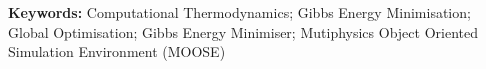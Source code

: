 %

\bigskip
\bigskip
\bigskip

\noindent
\textbf{Keywords:} Computational Thermodynamics; Gibbs Energy Minimisation; Global Optimisation; {\YJ} Gibbs Energy Minimiser; Mutiphysics Object Oriented Simulation Environment (MOOSE)

